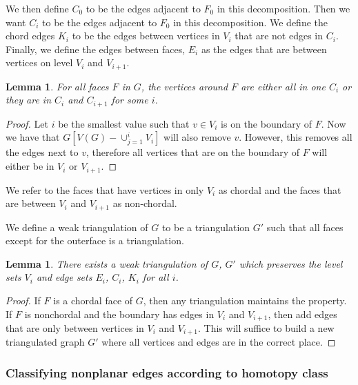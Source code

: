 \documentclass[]{report}
\newtheorem{lemma}[theorem]{Lemma}
\theoremstyle{definition}
\numberwithin{theorem}{section}
\numberwithin{equation}{section}
\begin{document}
We then define $C_0$ to be the edges adjacent to $F_0$ in this decomposition. Then we want $C_i$ to be the edges adjacent to $F_0$ in this decomposition. We define the chord edges $K_i$ to be the edges between vertices in $V_i$ that are not edges in $C_i$. Finally, we define the edges between faces, $E_i$ as the edges that are between vertices on level $V_i$ and $V_{i + 1}$.

\begin{lemma}
	For all faces $F$ in $G$, the vertices around $F$ are either all in one $C_i$ or they are in $C_i$ and $C_{i + 1}$ for some $i$.
\end{lemma}

\begin{proof}
	Let $i$ be the smallest value such that $v \in V_i$ is on the boundary of $F$. Now we have that $G[V(G) - \cup_{j = 1}^{i} V_i]$ will also remove $v$. However, this removes all the edges next to $v$, therefore all vertices that are on the boundary of $F$ will either be in $V_i$ or $V_{i + 1}$.
\end{proof}
We refer to the faces that have vertices in only $V_i$ as chordal and the faces that are between $V_i$ and $V_{i + 1}$ as non-chordal.

We define a weak triangulation of $G$ to be a triangulation $G'$ such that all faces except for the outerface is a triangulation.
\begin{lemma}
	There exists a weak triangulation of $G$, $G'$ which preserves the level sets $V_i$ and edge sets $E_i$, $C_i$, $K_i$ for all $i$. 
\end{lemma}

\begin{proof}
	If $F$ is a chordal face of $G$, then any triangulation maintains the property. If $F$ is nonchordal and the boundary has edges in $V_i$ and $V_{i + 1}$, then add edges that are only between vertices in $V_i$ and $V_{i + 1}$. This will suffice to build a new triangulated graph $G'$ where all vertices and edges are in the correct place. 
\end{proof}

\subsubsection{Classifying nonplanar edges according to homotopy class}
\end{document}
